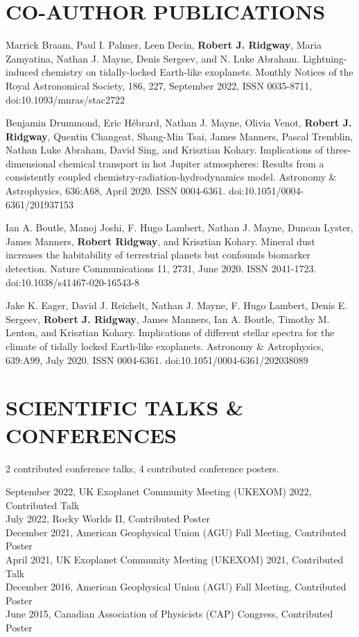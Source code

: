 \documentclass[letter, margin, 10pt]{res} %
\begin{document}
\begin{resume}
\section{CO-AUTHOR PUBLICATIONS}

Marrick Braam, Paul I. Palmer, Leen Decin, \textbf{Robert J. Ridgway}, Maria Zamyatina, Nathan J. Mayne, Denis Sergeev, and N. Luke Abraham. Lightning-induced chemistry on tidally-locked Earth-like exoplanets. Monthly Notices of the Royal Astronomical Society, 186, 227, September 2022, ISSN 0035-8711, doi:10.1093/mnras/stac2722

Benjamin Drummond, Eric H\'{e}brard, Nathan J. Mayne, Olivia Venot, \textbf{Robert J. Ridgway}, Quentin Changeat, Shang-Min Tsai, James Manners, Pascal Tremblin, Nathan Luke Abraham, David Sing, and Krisztian Kohary. Implications of three-dimensional chemical transport in hot Jupiter atmospheres: Results from a consistently coupled chemistry-radiation-hydrodynamics model. Astronomy \& Astrophysics, 636:A68, April 2020. ISSN 0004-6361. doi:10.1051/0004-6361/201937153

Ian A. Boutle, Manoj Joshi, F. Hugo Lambert, Nathan J. Mayne, Duncan Lyster, James Manners, \textbf{Robert Ridgway}, and Krisztian Kohary. Mineral dust increases the habitability of terrestrial planets but confounds biomarker detection. Nature Communications 11, 2731, June 2020. ISSN 2041-1723. doi:10.1038/s41467-020-16543-8

Jake K. Eager, David J. Reichelt, Nathan J. Mayne, F. Hugo Lambert, Denis E. Sergeev, \textbf{Robert J. Ridgway}, James Manners, Ian A. Boutle, Timothy M. Lenton, and Krisztian Kohary. Implications of different stellar spectra for the climate of tidally locked Earth-like exoplanets. Astronomy \& Astrophysics, 639:A99, July 2020. ISSN 0004-6361. doi:10.1051/0004-6361/202038089



\parskip \baselineskip
\vspace{-6pt}
\section{SCIENTIFIC TALKS \& CONFERENCES}
2 contributed conference talks, 4 contributed conference posters.

\vspace{-4pt}
September 2022, UK Exoplanet Community Meeting (UKEXOM) 2022, Contributed Talk \\
July 2022, Rocky Worlds II, Contributed Poster \\
December 2021, American Geophysical Union (AGU) Fall Meeting, Contributed Poster\\
April 2021, UK Exoplanet Community Meeting (UKEXOM) 2021, Contributed Talk\\
December 2016, American Geophysical Union (AGU) Fall Meeting, Contributed Poster\\
June 2015, Canadian Association of Physicists (CAP) Congress, Contributed Poster


\end{resume}
\end{document}
